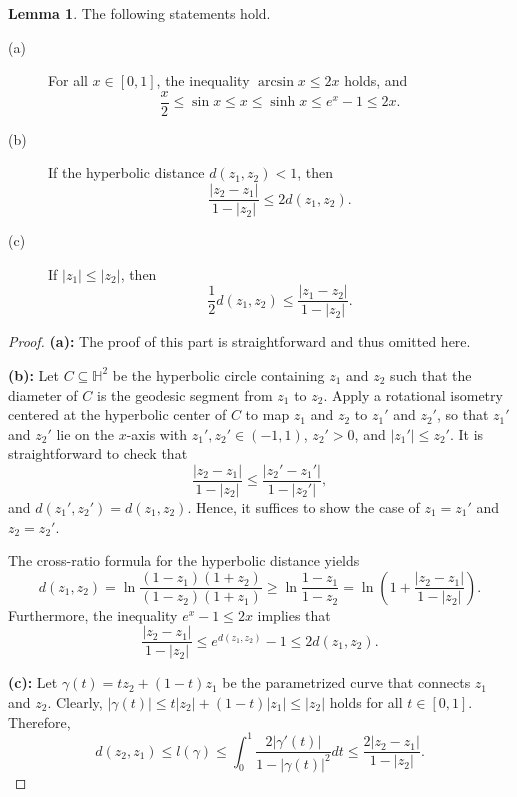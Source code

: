 \documentclass[12pt]{amsart}
\theoremstyle{definition}
\newtheorem{lemma}[theorem]{Lemma}
\begin{document}
\begin{lemma}\label{Lem: dist}
The following statements hold.
\begin{description}
\item[(a)]
For all $x\in[0, 1]$, the inequality $\arcsin x\leq 2x$ holds, and 
\begin{equation*}
\frac{x}{2}\leq \sin x \leq x\leq \sinh x\leq e^x - 1\leq 2x.
\end{equation*}
\item[(b)]
If the hyperbolic distance $d(z_1, z_2)<1$, then
\begin{equation*}
\frac{|z_2-z_1|}{1-|z_2|} \leq 2d(z_1, z_2).
\end{equation*}

\item[(c)]
If $|z_1|\leq |z_2|$, then
\begin{equation*}
\frac{1}{2}d(z_1, z_2) \leq \frac{|z_1-z_2|}{1-|z_2|}.
\end{equation*}
\end{description}
\end{lemma}
\begin{proof}
\textbf{(a):} The proof of this part is straightforward and thus omitted here.

\textbf{(b):}
Let $C\subseteq\mathbb{H}^2$ be the hyperbolic circle containing $z_1$ and $z_2$ such that the diameter of $C$ is the geodesic segment from $z_1$ to $z_2$. 
Apply a rotational isometry centered at the hyperbolic center of $C$ to map $z_1$ and $z_2$ to $z_1'$ and $z_2'$, so that $z_1'$ and $z_2'$ lie on the $x$-axis with $z_1', z_2'\in (-1,1)$, $z_2'>0$, and $|z_1'|\leq z_2'$.
It is straightforward to check that 
$$\frac{|z_2-z_1|}{1-|z_2|} \leq \frac{|z_2'-z_1'|}{1-|z_2'|},$$
and $d(z_1',z_2') = d(z_1, z_2)$. Hence, it suffices to show the case of $z_1 = z_1'$ and $z_2 = z_2'$. 

The cross-ratio formula for the hyperbolic distance yields
\begin{equation*}
d(z_1,z_2)
=\ln \frac{(1-z_1)(1+z_2)}{(1-z_2)(1+z_1)}
\geq \ln\frac{1-z_1}{1-z_2}
=\ln \left(1 +\frac{|z_2-z_1|}{1-|z_2|}\right).
\end{equation*}
Furthermore, the inequality $e^x-1\leq 2x$ implies that
\begin{equation*}
\frac{|z_2-z_1|}{1-|z_2|}\leq e^{d(z_1,z_2)}-1
\leq 2d(z_1, z_2).
\end{equation*}

\textbf{(c):}
Let $\gamma(t)=tz_2+(1-t)z_1$ be the parametrized curve that connects $z_1$ and $z_2$. 
Clearly, $|\gamma(t)|\leq t|z_2|+(1-t)|z_1|\leq |z_2|$ holds for all $t\in[0,1]$.
Therefore,
\begin{equation*}
d(z_2,z_1)
\leq l(\gamma)
\leq \int_0^1\frac{2|\gamma'(t)|}{1-|\gamma(t)|^2}dt \leq \frac{2|z_2-z_1|}{1-|z_2|}.
\end{equation*}
\end{proof}
\end{document}
